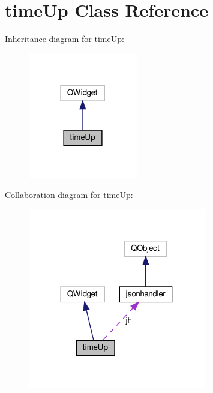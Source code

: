 \hypertarget{classtimeUp}{}\section{time\+Up Class Reference}
\label{classtimeUp}


Inheritance diagram for time\+Up\+:
\nopagebreak
\begin{figure}[H]
\begin{center}
\leavevmode
\includegraphics[width=135pt]{classtimeUp__inherit__graph}
\end{center}
\end{figure}


Collaboration diagram for time\+Up\+:
\nopagebreak
\begin{figure}[H]
\begin{center}
\leavevmode
\includegraphics[width=220pt]{classtimeUp__coll__graph}
\end{center}
\end{figure}
